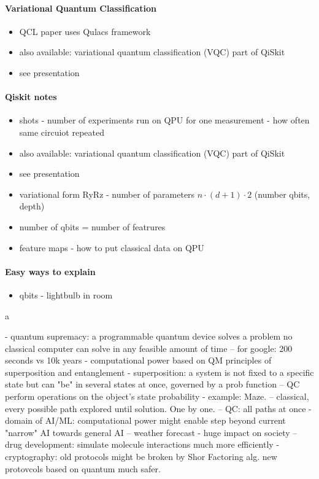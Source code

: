 \paragraph{Variational Quantum Classification}
\begin{itemize}
  \item QCL paper uses Qulacs framework
  \item also available: variational quantum classification (VQC) part of QiSkit
  \item see presentation
\end{itemize}

\paragraph{Qiskit notes}
\begin{itemize}
  \item shots - number of experiments run on QPU for one measurement - how often same circuiot repeated
  \item also available: variational quantum classification (VQC) part of QiSkit
  \item see presentation
  \item variational form RyRz - number of parameters $n\cdot(d+1)\cdot2$ (number qbits, depth)
  \item number of qbits = number of featrures
  \item feature maps - how to put classical data on QPU
\end{itemize}

\paragraph{Easy ways to explain}
\begin{itemize}
  \item qbits - lightbulb in room
\end{itemize}a



- quantum supremacy: a programmable quantum device solves a problem no classical
  computer can solve in any feasible amount of time
-- for google: 200 seconds  vs 10k years
- computational power based on QM principles of superposition and entanglement
- superposition: a system is not fixed to a specific state but can "be" in
  several states at once, governed by a prob function
-- QC perform operations on the object's state probability
- example: Maze.
-- classical, every possible path explored until solution. One by one.
-- QC: all paths at once
- domain of AI/ML: computational power might enable step beyond current "narrow"
  AI towards general AI
-- weather forecast - huge impact on society
-- drug development: simulate molecule interactions much more efficiently
- cryptography: old protocols might be broken by Shor Factoring alg. new
  protovcols based on quantum much safer.


